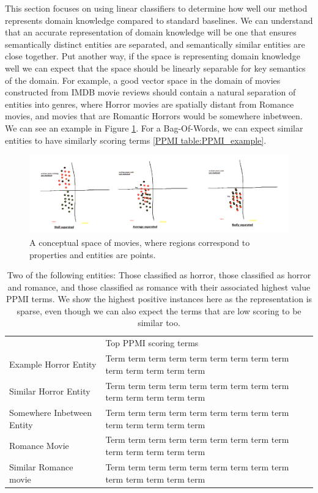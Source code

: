 This section focuses on using linear classifiers to determine how well our method represents domain knowledge compared to standard baselines. We can understand that an accurate representation of domain knowledge will be one that ensures semantically distinct entities are separated, and semantically similar entities are close together. Put another way, if the space is representing domain knowledge well we can expect that the space should be linearly separable for key semantics of the domain. For example, a good vector space in the domain of movies constructed from IMDB movie reviews should contain a natural separation of entities into genres, where Horror movies are spatially distant from Romance movies, and movies that are Romantic Horrors would be somewhere inbetween. We can see an example in Figure \ref{figure:genres_separated}. For a Bag-Of-Words, we can expect similar entities to have similarly scoring terms \ref{PPMI table:PPMI_example}.

\begin{figure}[t]
	\includegraphics[width=\textwidth]{images/genres_separated.png}
	\centering
	\caption{A conceptual space of movies, where regions correspond to properties and entities are points.}\label{figure:genres_separated}
\end{figure}

\begin{table}[]
	\begin{tabular}{ll}
		& Top PPMI scoring terms                                                \\
		Example Horror Entity      & Term term term term term term term term term term term term term term \\
		Similar Horror Entity      & Term term term term term term term term term term term term term term \\
		Somewhere Inbetween Entity & Term term term term term term term term term term term term term term \\
		Romance Movie              & Term term term term term term term term term term term term term term \\
		Similar Romance movie      & Term term term term term term term term term term term term term term
	\end{tabular}
\caption{Two of the following entities: Those classified as horror, those classified as horror and romance, and those classified as romance with their associated highest value PPMI terms. We show the highest positive instances here as the representation is sparse, even though we can also expect the terms that are low scoring to be similar too.}
\label{table:PPMI_example}
\end{table}

